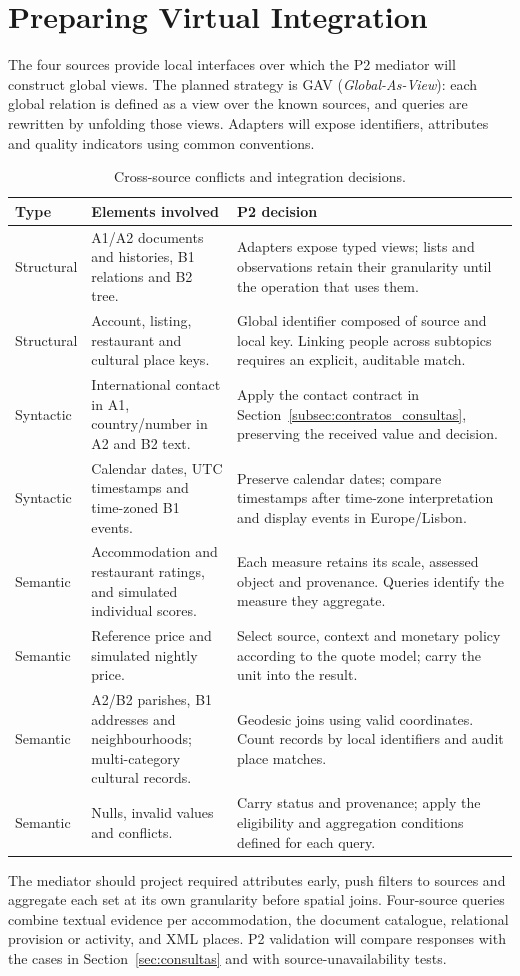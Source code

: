 \section{Preparing Virtual Integration}\label{sec:preparacao_integracao}
The four sources provide local interfaces over which the P2 mediator will construct global views. The planned strategy is GAV (\emph{Global-As-View}): each global relation is defined as a view over the known sources, and queries are rewritten by unfolding those views\cite{doan2012principles}. Adapters will expose identifiers, attributes and quality indicators using common conventions.
\begin{table}[H]\centering\footnotesize\setlength{\tabcolsep}{4pt}\renewcommand{\arraystretch}{1.1}
\caption{Cross-source conflicts and integration decisions.}\label{tab:heterogeneidade}
\begin{tabularx}{\textwidth}{p{2cm}p{4cm}X}\toprule\textbf{Type} & \textbf{Elements involved} & \textbf{P2 decision} \\\midrule
Structural & A1/A2 documents and histories, B1 relations and B2 tree. & Adapters expose typed views; lists and observations retain their granularity until the operation that uses them. \\
Structural & Account, listing, restaurant and cultural place keys. & Global identifier composed of source and local key. Linking people across subtopics requires an explicit, auditable match. \\
Syntactic & International contact in A1, country/number in A2 and B2 text. & Apply the contact contract in Section~\ref{subsec:contratos_consultas}, preserving the received value and decision. \\
Syntactic & Calendar dates, UTC timestamps and time-zoned B1 events. & Preserve calendar dates; compare timestamps after time-zone interpretation and display events in Europe/Lisbon. \\
Semantic & Accommodation and restaurant ratings, and simulated individual scores. & Each measure retains its scale, assessed object and provenance. Queries identify the measure they aggregate. \\
Semantic & Reference price and simulated nightly price. & Select source, context and monetary policy according to the quote model; carry the unit into the result. \\
Semantic & A2/B2 parishes, B1 addresses and neighbourhoods; multi-category cultural records. & Geodesic joins using valid coordinates. Count records by local identifiers and audit place matches. \\
Semantic & Nulls, invalid values and conflicts. & Carry status and provenance; apply the eligibility and aggregation conditions defined for each query. \\\bottomrule\end{tabularx}\end{table}
The mediator should project required attributes early, push filters to sources and aggregate each set at its own granularity before spatial joins. Four-source queries combine textual evidence per accommodation, the document catalogue, relational provision or activity, and XML places. P2 validation will compare responses with the cases in Section~\ref{sec:consultas} and with source-unavailability tests.
